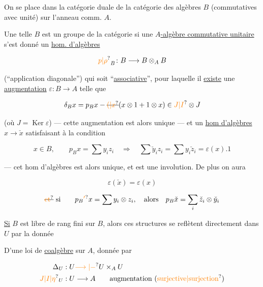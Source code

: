 


On se place dans la catégorie duale de la catégorie des algèbres $B$ (commutatives avec unité) sur l'anneau comm. $A$.


Une telle $B$ est un groupe de la catégorie si  une \uline{$A$-algèbre commutative unitaire} s'est donné un \uline{hom. d'algèbres}

\[
\unsure{p|\rho}_{B}\colon B\longrightarrow B\otimes_A B
\]

(``application diagonale'') qui soit ``\uline{associative}'', pour laquelle il \uline{existe} une \uline{augmentation}  $\varepsilon:B\to A$  telle que

\[
\delta_B x=p_Bx-\deleted{\unsure{( |x}}(x\otimes1+1\otimes x)\in\unsure{J|I}\otimes J
\]

(où $J=\operatorname{Ker}\varepsilon$) --- cette augmentation est alors unique --- et un \uline{hom d'algèbres} $x\longrightarrow\check{x}$ satisfaisant à la condition

\[
x\in B,\qquad p_Bx=\sum y_i z_i\quad\Longrightarrow\quad \sum\check{y}_i z_i=\sum y_i\check{z}_i=\varepsilon(x).1
\]

--- cet hom d'algèbres est alors unique, et est une involution. De plus on aura

\[
\varepsilon(\check{x})=\varepsilon(x)
\]

\[
\text{\deleted{\unsure{et}} si}\qquad p_B\unsure{'}x=\sum y_i\otimes z_i,\quad\text{alors}\quad p_B\check{x}=\sum_i\check{z}_i\otimes\check{y}_i
\]

\uline{Si} $B$ est libre de rang fini sur $B$, alors ces structures se reflètent directement dans $U$ par la donnée 


D'une loi de \uline{coalgèbre}  sur $A$,  donnée par

\[
\begin{aligned}
\Delta_U &: U\unsure{\longrightarrow|-}U\times_A U\\
\unsure{J|I|\eta}_U &: U\longrightarrow A\qquad \text{augmentation (\unsure{surjective|surjection})}
\end{aligned}
\]

